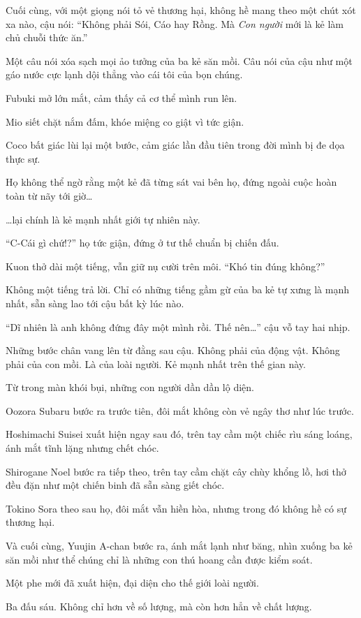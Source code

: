 \documentclass[../main.tex]{subfiles}
\begin{document}
Cuối cùng, với một giọng nói tỏ vẻ thương hại, không hề mang theo một chút xót xa nào, cậu nói: ``Không phải Sói, Cáo hay Rồng. Mà \emph{Con người} mới là kẻ làm chủ chuỗi thức ăn.''

Một câu nói xóa sạch mọi ảo tưởng của ba kẻ săn mồi. Câu nói của cậu như một gáo nước cực lạnh dội thẳng vào cái tôi của bọn chúng.

Fubuki mở lớn mắt, cảm thấy cả cơ thể mình run lên.

Mio siết chặt nắm đấm, khóe miệng co giật vì tức giận.

Coco bất giác lùi lại một bước, cảm giác lần đầu tiên trong đời mình bị đe dọa thực sự.

Họ không thể ngờ rằng một kẻ đã từng sát vai bên họ, đứng ngoài cuộc hoàn toàn từ nãy tới giờ\dots

\dots lại chính là kẻ mạnh nhất giới tự nhiên này.

``C-Cái gì chứ!?'' họ tức giận, đứng ở tư thế chuẩn bị chiến đấu.

Kuon thở dài một tiếng, vẫn giữ nụ cười trên môi. ``Khó tin đúng không?''

Không một tiếng trả lời. Chỉ có những tiếng gầm gừ của ba kẻ tự xưng là mạnh nhất, sẵn sàng lao tới cậu bất kỳ lúc nào.

``Dĩ nhiên là anh không đứng đây một mình rồi. Thế nên\dots'' cậu vỗ tay hai nhịp.

Những bước chân vang lên từ đằng sau cậu. Không phải của động vật. Không phải của con mồi. Là của loài người. Kẻ mạnh nhất trên thế gian này.

Từ trong màn khói bụi, những con người dần dần lộ diện.

Oozora Subaru bước ra trước tiên, đôi mắt không còn vẻ ngây thơ như lúc trước.

Hoshimachi Suisei xuất hiện ngay sau đó, trên tay cầm một chiếc rìu sáng loáng, ánh mắt tĩnh lặng nhưng chết chóc.

Shirogane Noel bước ra tiếp theo, trên tay cầm chặt cây chùy khổng lồ, hơi thở đều đặn như một chiến binh đã sẵn sàng giết chóc.

Tokino Sora theo sau họ, đôi mắt vẫn hiền hòa, nhưng trong đó không hề có sự thương hại.

Và cuối cùng, Yuujin A-chan bước ra, ánh mắt lạnh như băng, nhìn xuống ba kẻ săn mồi như thể chúng chỉ là những con thú hoang cần được kiểm soát.

Một phe mới đã xuất hiện, đại diện cho thế giới loài người.

Ba đấu sáu. Không chỉ hơn về số lượng, mà còn hơn hẳn về chất lượng.
\end{document}
